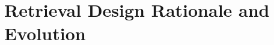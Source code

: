 \chapter{Retrieval Design Rationale and Evolution}\label{ch:retrieval-design-rationale-and-evolution}


